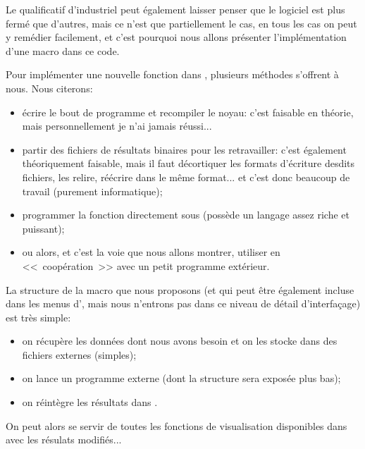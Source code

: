 Le qualificatif d'industriel peut également laisser penser que le logiciel est plus fermé que d'autres, mais ce
n'est que partiellement le cas, en tous les cas on peut y remédier facilement, et c'est pourquoi nous allons
présenter l'implémentation d'une macro dans ce code.

\medskip
Pour implémenter une nouvelle fonction dans \ansys, plusieurs méthodes s'offrent à nous. Nous citerons:
\begin{itemize}
   \item écrire le bout de programme et recompiler le noyau: c'est faisable en théorie, mais personnellement je n'ai
	jamais réussi...
   \item partir des fichiers de résultats binaires pour les retravailler: c'est également théoriquement faisable, mais
	il faut décortiquer les formats d'écriture desdits fichiers, les relire, réécrire dans le même format...
	et c'est donc beaucoup de travail (purement informatique);
   \item programmer la fonction directement sous \ansys (\ansys possède un langage assez riche et puissant);
   \item ou alors, et c'est la voie que nous allons montrer, utiliser \ansys en <<~coopération~>> avec un
	petit programme extérieur.
\end{itemize}

\medskip
La structure de la macro \ansys que nous proposons (et qui peut être également incluse dans les menus d'\ansys, mais
nous n'entrons pas dans ce niveau de détail d'interfaçage) est très simple:
\begin{itemize}
   \item on récupère les données dont nous avons besoin et on les stocke dans des fichiers externes (simples);
   \item on lance un programme externe (dont la structure sera exposée plus bas);
   \item on réintègre les résultats dans \ansys.
\end{itemize}
On peut alors se servir de toutes les fonctions de visualisation disponibles dans \ansys avec les résulats modifiés...

